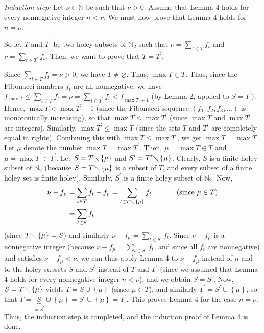 \documentclass[12pt,final,notitlepage,onecolumn]{article}%
\begin{document}
\textit{Induction step:} Let $\nu\in\mathbb{N}$ be such that $\nu>0$. Assume
that Lemma 4 holds for every nonnegative integer $n<\nu$. We must now prove
that Lemma 4 holds for $n=\nu$.

So let $T$ and $T^{\prime}$ be two holey subsets of $\mathbb{N}_{2}$ such that
$\nu=\sum\limits_{t\in T}f_{t}$ and $\nu=\sum\limits_{t\in T^{\prime}}f_{t}$.
Then, we want to prove that $T=T^{\prime}$.

Since $\sum\limits_{t\in T}f_{t}=\nu>0$, we have $T\neq\varnothing$. Thus,
$\max T\in T$. Thus, since the Fibonacci numbers $f_{t}$ are all nonnegative,
we have $f_{\max T}\leq\sum\limits_{t\in T}f_{t}=\nu=\sum\limits_{t\in
T^{\prime}}f_{t}<f_{\max T^{\prime}+1}$ (by Lemma 2, applied to $S=T^{\prime}%
$). Hence, $\max T<\max T^{\prime}+1$ (since the Fibonacci sequence $\left(
f_{1},f_{2},f_{3},...\right)  $ is monotonically increasing), so that $\max
T\leq\max T^{\prime}$ (since $\max T$ and $\max T^{\prime}$ are integers).
Similarly, $\max T^{\prime}\leq\max T$ (since the sets $T$ and $T^{\prime}$
are completely equal in rights). Combining this with $\max T\leq\max
T^{\prime}$, we get $\max T=\max T^{\prime}$. Let $\mu$ denote the number
$\max T=\max T^{\prime}$. Then, $\mu=\max T\in T$ and $\mu=\max T^{\prime}\in
T^{\prime}$. Let $S=T\diagdown\left\{  \mu\right\}  $ and $S^{\prime
}=T^{\prime}\diagdown\left\{  \mu\right\}  $. Clearly, $S$ is a finite holey
subset of $\mathbb{N}_{2}$ (because $S=T\diagdown\left\{  \mu\right\}  $ is a
subset of $T$, and every subset of a finite holey set is finite holey).
Similarly, $S^{\prime}$ is a finite holey subset of $\mathbb{N}_{2}$. Now,%
\begin{align*}
\nu-f_{\mu}  &  =\sum\limits_{t\in T}f_{t}-f_{\mu}=\sum\limits_{t\in
T\diagdown\left\{  \mu\right\}  }f_{t}\ \ \ \ \ \ \ \ \ \ \left(  \text{since
}\mu\in T\right) \\
&  =\sum\limits_{t\in S}f_{t}%
\end{align*}
(since $T\diagdown\left\{  \mu\right\}  =S$) and similarly $\nu-f_{\mu}%
=\sum\limits_{t\in S^{\prime}}f_{t}$. Since $\nu-f_{\mu}$ is a nonnegative
integer (because $\nu-f_{\mu}=\sum\limits_{t\in S^{\prime}}f_{t}$, and since
all $f_{t}$ are nonnegative) and satisfies $\nu-f_{\mu}<\nu$, we can thus
apply Lemma 4 to $\nu-f_{\mu}$ instead of $n$ and to the holey subsets $S$ and
$S^{\prime}$ instead of $T$ and $T^{\prime}$ (since we assumed that Lemma 4
holds for every nonnegative integer $n<\nu$), and we obtain $S=S^{\prime}$.
Now, $S=T\diagdown\left\{  \mu\right\}  $ yields $T=S\cup\left\{  \mu\right\}
$ (since $\mu\in T$), and similarly $T^{\prime}=S^{\prime}\cup\left\{
\mu\right\}  $, so that $T=\underbrace{S}_{=S^{\prime}}\cup\left\{
\mu\right\}  =S^{\prime}\cup\left\{  \mu\right\}  =T^{\prime}$. This proves
Lemma 4 for the case $n=\nu$. Thus, the induction step is completed, and the
induction proof of Lemma 4 is done.
\end{document}
